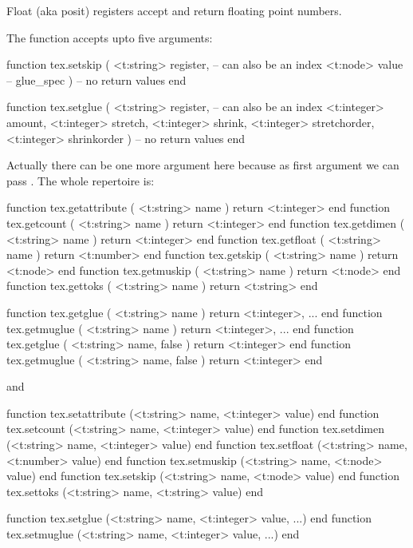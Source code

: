     \startitem
        Float (aka posit) registers accept and return floating point numbers.
    \stopitem

\stopitemize

The  function accepts upto five arguments:

\starttyping[option=LUA]
function tex.setskip (
    <t:string> register, -- can also be an index
    <t:node>   value     -- glue_spec
)
    -- no return values
end

function tex.setglue (
    <t:string>  register, -- can also be an index
    <t:integer> amount,
    <t:integer> stretch,
    <t:integer> shrink,
    <t:integer> stretchorder,
    <t:integer> shrinkorder
)
    -- no return values
end
\stoptyping

Actually there can be one more argument here because as first argument we can
pass . The whole repertoire is:

\starttyping[option=LUA]
function tex.getattribute ( <t:string> name ) return <t:integer> end
function tex.getcount     ( <t:string> name ) return <t:integer> end
function tex.getdimen     ( <t:string> name ) return <t:integer> end
function tex.getfloat     ( <t:string> name ) return <t:number>  end
function tex.getskip      ( <t:string> name ) return <t:node>    end
function tex.getmuskip    ( <t:string> name ) return <t:node>    end
function tex.gettoks      ( <t:string> name ) return <t:string>  end

function tex.getglue   ( <t:string> name        ) return <t:integer>, ... end
function tex.getmuglue ( <t:string> name        ) return <t:integer>, ... end
function tex.getglue   ( <t:string> name, false ) return <t:integer> end
function tex.getmuglue ( <t:string> name, false ) return <t:integer> end
\stoptyping

and

\starttyping[option=LUA]
function tex.setattribute (<t:string> name, <t:integer> value) end
function tex.setcount     (<t:string> name, <t:integer> value) end
function tex.setdimen     (<t:string> name, <t:integer> value) end
function tex.setfloat     (<t:string> name, <t:number>  value) end
function tex.setmuskip    (<t:string> name, <t:node> value) end
function tex.setskip      (<t:string> name, <t:node>   value) end
function tex.settoks      (<t:string> name, <t:string>  value) end

function tex.setglue      (<t:string> name, <t:integer> value, ...) end
function tex.setmuglue    (<t:string> name, <t:integer> value, ...) end
\stoptyping

